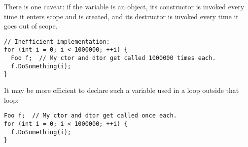 There is one caveat: if the variable is an object, its constructor is invoked every time it enters scope and is created, and its destructor is invoked every time it goes out of scope.
\begin{verbatim}
// Inefficient implementation:
for (int i = 0; i < 1000000; ++i) {
  Foo f;  // My ctor and dtor get called 1000000 times each.
  f.DoSomething(i);
}
\end{verbatim}
It may be more efficient to declare such a variable used in a loop outside that loop:
\begin{verbatim}
Foo f;  // My ctor and dtor get called once each.
for (int i = 0; i < 1000000; ++i) {
  f.DoSomething(i);
}
\end{verbatim}
